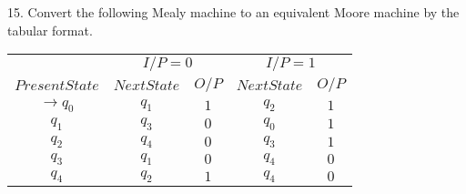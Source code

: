 \documentclass[8pt]{beamer}
\begin{document}
\begin{frame}
15. Convert the following Mealy machine to an equivalent Moore machine by the tabular format.

\begin{center}
\begin{tabular}{ccccc}
 \hline

 \hline

 \hline

 \hline
 &  \multicolumn{2}{c}{$I/P = 0$ } &  \multicolumn{2}{c}{$I/P = 1$}  \\
  \cline{2-3}                         \cline{4-5}
 $Present State$ &   $Next State$  & $O/P$ &  $Next State$  & $O/P$\\
\hline
$\rightarrow q_0$  &  $q_1$  &  $1$  &  $q_2$  & $1$ \\
$q_1$             &  $q_3$  &  $0$  &  $q_0$  & $1$ \\
$q_2$             &  $q_4$  &  $0$  &  $q_3$  & $1$ \\
$q_3$             &  $q_1$  &  $0$  &  $q_4$  & $0$ \\
$q_4$             &  $q_2$  &  $1$  &  $q_4$  & $0$ \\
 \hline

 \hline

 \hline

 \hline
\end{tabular}
\end{center}

\vspace*{0.3cm}
\end{frame}
\end{document}
